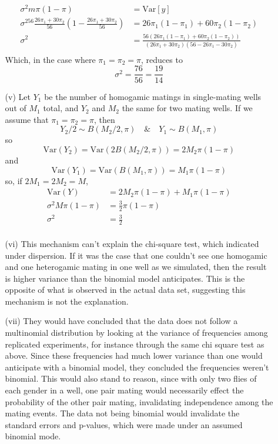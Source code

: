 \documentclass[11pt]{article}
\newcommand{\var}{\mathrm{Var}}
\theoremstyle{definition}
\begin{document}
\begin{itemize}
\begin{itemize}
\begin{align*}
                    \sigma^2m\pi(1-\pi) &= \var[y] \\
                    \sigma^256\frac{26\pi_1 + 30\pi_2}{56}\left(1-\frac{26\pi_1 + 30\pi_2}{56}\right) &= 26\pi_1(1-\pi_1) + 60\pi_2(1-\pi_2)\\
                    \sigma^2&= \frac{56(26\pi_1(1-\pi_1) + 60\pi_2(1-\pi_2))}{(26\pi_1 + 30\pi_2)(56-26\pi_1 - 30\pi_2)}\\
                \end{align*}
                Which, in the case where $\pi_1=\pi_2=\pi$, reduces to 
                \[ \sigma^2 = \frac{76}{56} = \frac{19}{14}\]
            \item[(v)]
                Let $Y_1$ be the number of homogamic matings in single-mating wells out of $M_1$ total,  and $Y_2$ and $M_2$ the same for two mating wells. If we assume that $\pi_1=\pi_2=\pi$, then 
                \[ Y_2/2 \sim B(M_2/2,\pi) \quad \&\quad Y_1 \sim B(M_1,\pi)\]
                so 
                \[\var(Y_2) = \var(2B(M_2/2,\pi)) = 2M_2\pi(1-\pi)\]
                and 
                \[\var(Y_1) = \var(B(M_1,\pi)) = M_1\pi(1-\pi)\]
                so, if $2M_1=2M_2=M$,
                \begin{align*}
                    \var(Y) &= 2M_2\pi(1-\pi)+M_1\pi(1-\pi) \\
                    \sigma^2M\pi(1-\pi) &= \frac{3}{2}\pi(1-\pi) \\
                    \sigma^2 &= \frac{3}{2} \\
                \end{align*}
            \item[(vi)]
                This mechanism can't explain the chi-square test, which indicated under dispersion. If it was the case that one couldn't see one homogamic and one heterogamic mating in one well as we simulated, then the result is higher variance than the binomial model anticipates. This is the opposite of what is observed in the actual data set, suggesting this mechanism is not the explanation.  
            \item[(vii)]
                They would have concluded that the data does not follow a multinomial distribution by looking at the variance of frequencies among replicated experiments, for instance through the same chi square test as above. Since these frequencies had much lower variance than one would anticipate with a binomial model, they concluded the frequencies weren't binomial. This would also stand to reason, since with only two flies of each gender in a well, one pair mating would necessarily effect the probability of the other pair mating, invalidating independence among the mating events. The data not being binomial would invalidate the standard errors and p-values, which were made under an assumed binomial mode.

\end{itemize}
\end{itemize}
\end{document}
